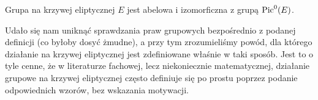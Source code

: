 \begin{corollary}
Grupa na krzywej eliptycznej $E$
jest abelowa i izomorficzna z grupą $\operatorname{Pic}^0(E)$.
\end{corollary}

Udało się nam uniknąć sprawdzania praw grupowych
bezpośrednio z podanej definicji (co byłoby dosyć żmudne),
a przy tym zrozumieliśmy powód,
dla którego działanie na krzywej eliptycznej jest zdefiniowane
właśnie w taki sposób.
Jest to o tyle cenne,
że w literaturze fachowej, lecz niekoniecznie matematycznej,
działanie grupowe na krzywej eliptycznej
często definiuje się po prostu poprzez podanie odpowiednich wzorów,
bez wskazania motywacji.
